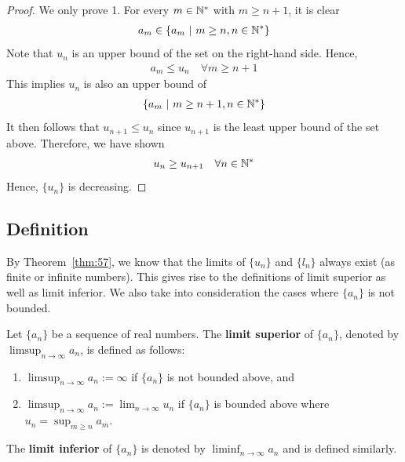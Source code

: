 \documentclass[thmcnt=section, 12pt]{my-elegantbook}
\begin{document}
\begin{proof}
    We only prove 1. For every $m \in \mathbb{N}^\ast$ with $m \geq n+1$, it is clear
    \begin{align*}
        a_{m} \in \left\{ a_m \ \middle| \ m \geq n, n \in \mathbb{N}^\ast \right\}
    \end{align*}
    Note that $u_n$ is an upper bound of the set on the right-hand side. Hence, 
    \begin{align*}
        a_m \leq u_n
        \quad \forall m \geq n+1
    \end{align*}
    This implies $u_n$ is also an upper bound of 
    \begin{align*}
        \left\{ a_m \ \middle| \ m \geq n+1, n \in \mathbb{N}^\ast \right\}
    \end{align*}
    It then follows that $u_{n+1} \leq u_n$ since $u_{n+1}$ is the least upper bound of the set above. Therefore, we have shown 
    \begin{align*}
        u_{n} \geq u_{n+1}
        \quad \forall n \in \mathbb{N}^\ast
    \end{align*}
    Hence, $\{u_n\}$ is decreasing.
\end{proof}


\subsection{Definition}

By Theorem~\ref{thm:57}, we know that the limits of $\{u_n\}$ and $\{l_n\}$ always exist (as finite or infinite numbers). This gives rise to the definitions of limit superior as well as limit inferior. We also take into consideration the cases where $\{a_n\}$ is not bounded.

\begin{definition}
    Let $\{a_n\}$ be a sequence of real numbers. The \textbf{limit superior} of $\{a_n\}$, denoted by $\limsup_{n \to \infty} a_n$, is defined as follows:
    \begin{enumerate}
        \item $\limsup_{n \to \infty} a_n := \infty$ if $\{a_n\}$ is not bounded above, and 
        \item $\limsup_{n \to \infty} a_n := \lim_{n \to \infty} u_n$ if $\{a_n\}$ is bounded above where $u_n = \sup_{m \geq n} a_m$.
    \end{enumerate}
    The \textbf{limit inferior} of $\{a_n\}$ is denoted by $\liminf_{n \to \infty} a_n$ and is defined similarly.
\end{definition}
\end{document}
